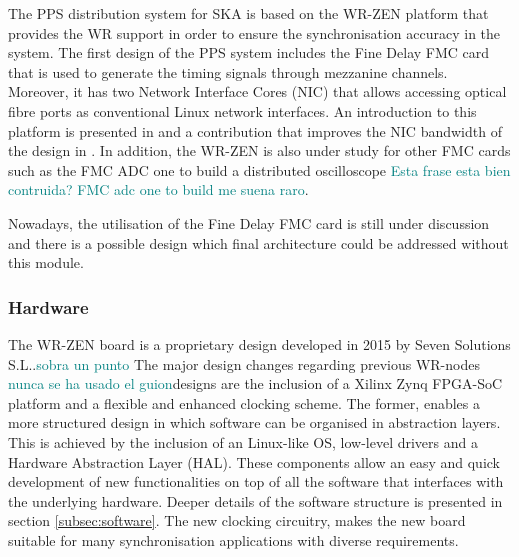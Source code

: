 The PPS distribution system for SKA is based on the WR-ZEN platform that
provides the WR support in order to ensure the synchronisation accuracy in the
system. The first design of the PPS system includes the Fine Delay FMC card
that is used to generate the timing signals through mezzanine channels.
Moreover, it has two Network Interface Cores (NIC) that allows accessing
optical fibre ports as conventional Linux network interfaces. An introduction
to this platform is presented in \cite{migueljl-paper-wr-zen-intro} and a
contribution that improves the NIC bandwidth of the design in
\cite{jorgesg-paper-wr-zen-dma}. In addition, the WR-ZEN is also under study
for other FMC cards such as the FMC ADC one to build a distributed oscilloscope
\cite{joselj-paper-wr-zen-adc} \textcolor{teal}{Esta frase esta bien contruida? 
FMC adc one to build me suena raro}.

Nowadays, the utilisation of the Fine Delay FMC card is still under discussion
and there is a possible design which final architecture could be addressed
without this module.

\subsubsection{Hardware} \label{subsec:hardware}

The WR-ZEN board is a proprietary design developed in 2015 by Seven Solutions 
S.L..\textcolor{teal}{sobra un punto} 
The major design changes regarding previous WR-nodes \textcolor{teal}{nunca se 
ha usado el guion}designs
are the inclusion of a Xilinx Zynq FPGA-SoC platform and a
flexible and enhanced clocking scheme. The former, enables a more structured
design in which software can be organised in abstraction layers. This is
achieved by the inclusion of an Linux-like OS, low-level drivers and a
Hardware Abstraction Layer (HAL). These components allow an easy and quick
development of new functionalities on top of all the software that interfaces
with the underlying hardware. Deeper details of the software structure is
presented in section  \ref{subsec:software}. The new clocking circuitry, makes
the new board suitable for many synchronisation applications with diverse
requirements.

